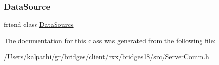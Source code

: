 \mbox{\label{classbridges_1_1_server_comm_a7998ddaa8bd7c3b9a7cd2a8cbf3573c4}} 
\subsubsection{\texorpdfstring{Data\+Source}{DataSource}}
{\footnotesize\ttfamily friend class \mbox{\hyperlink{classbridges_1_1_data_source}{Data\+Source}}\hspace{0.3cm}{\ttfamily [friend]}}



The documentation for this class was generated from the following file\+:\begin{DoxyCompactItemize}
\item 
/\+Users/kalpathi/gr/bridges/client/cxx/bridges18/src/\mbox{\hyperlink{_server_comm_8h}{Server\+Comm.\+h}}\end{DoxyCompactItemize}
